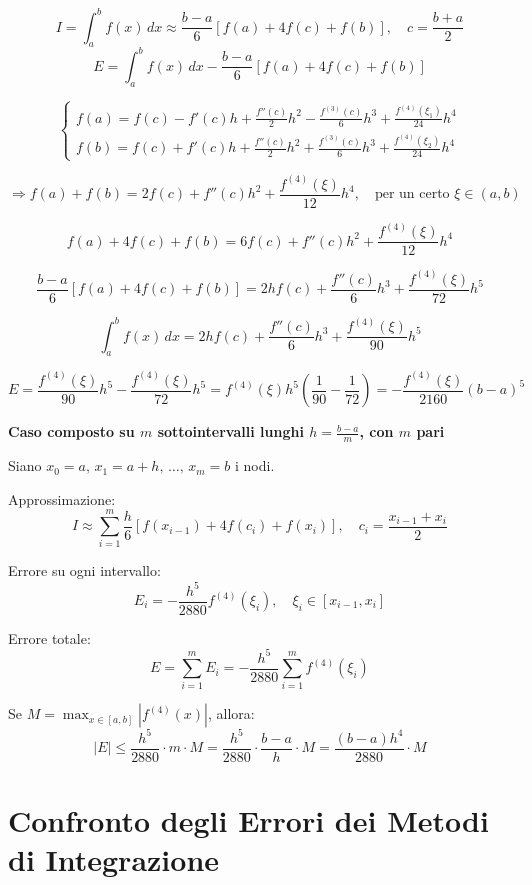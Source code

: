 \documentclass[12pt,a4paper]{article}
\begin{document}
\[
I = \int_a^b f(x)\,dx \approx \frac{b - a}{6} [f(a) + 4f(c) + f(b)],\quad c= \frac{b+a}{2}
\]
\[
E = \int_a^b f(x)\,dx - \frac{b - a}{6} [f(a) + 4f(c) + f(b)]
\]

\[\begin{cases}
f(a) = f(c) - f'(c)h + \frac{f''(c)}{2}h^2 - \frac{f^{(3)}(c)}{6}h^3 + \frac{f^{(4)}(\xi_1)}{24}h^4\\
f(b) = f(c) + f'(c)h + \frac{f''(c)}{2}h^2 + \frac{f^{(3)}(c)}{6}h^3 + \frac{f^{(4)}(\xi_2)}{24}h^4
\end{cases}
\]

\[
\Rightarrow f(a) + f(b) = 2f(c) + f''(c)h^2 + \frac{f^{(4)}(\xi)}{12}h^4,\quad \text{per un certo } \xi \in (a,b)
\]

\[
f(a) + 4f(c) + f(b) = 6f(c) + f''(c)h^2 + \frac{f^{(4)}(\xi)}{12}h^4
\]

\[
\frac{b - a}{6} [f(a) + 4f(c) + f(b)] = 2h f(c) + \frac{f''(c)}{6}h^3 + \frac{f^{(4)}(\xi)}{72}h^5
\]

\[
\int_a^b f(x)\,dx = 2h f(c) + \frac{f''(c)}{6}h^3 + \frac{f^{(4)}(\xi)}{90}h^5
\]

\[
E = \frac{f^{(4)}(\xi)}{90}h^5 - \frac{f^{(4)}(\xi)}{72}h^5 = f^{(4)}(\xi)h^5\left(\frac{1}{90} - \frac{1}{72}\right) = -\frac{f^{(4)}(\xi)}{2160}(b - a)^5
\]

\textbf{Caso composto su \(m\) sottointervalli lunghi \(h = \frac{b - a}{m}\), con \(m\) pari}

Siano \(x_0 = a,\, x_1 = a + h,\, \dots,\, x_m = b\) i nodi.

Approssimazione:
\[
I \approx \sum_{i=1}^m \frac{h}{6} [f(x_{i-1}) + 4f(c_i) + f(x_i)],\quad c_i = \frac{x_{i-1} + x_i}{2}
\]

Errore su ogni intervallo:
\[
E_i = -\frac{h^5}{2880} f^{(4)}(\xi_i),\quad \xi_i \in [x_{i-1}, x_i]
\]

Errore totale:
\[
E = \sum_{i=1}^m E_i = -\frac{h^5}{2880} \sum_{i=1}^m f^{(4)}(\xi_i)
\]

Se \(M = \max_{x \in [a,b]} |f^{(4)}(x)|\), allora:
\[
|E| \leq \frac{h^5}{2880} \cdot m \cdot M = \frac{h^5}{2880} \cdot \frac{b-a}{h} \cdot M = \frac{(b-a)h^4}{2880} \cdot M
\]



\section*{Confronto degli Errori dei Metodi di Integrazione}
\end{document}
